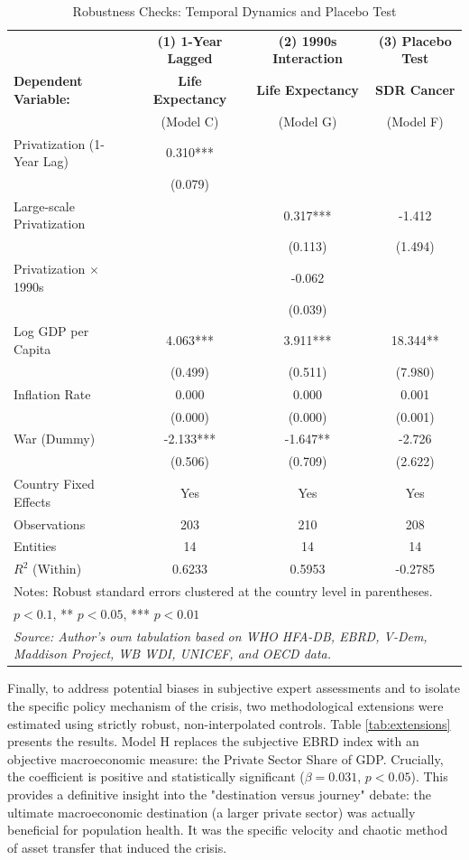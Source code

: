 \documentclass[en,magisterska]{pracamgr}
\begin{document}
\begin{table}[H]
\centering
\caption{Robustness Checks: Temporal Dynamics and Placebo Test}
\label{tab:robustness_c}
\footnotesize
\begin{tabular}{l c c c}
\toprule
 & \textbf{(1) 1-Year Lagged} & \textbf{(2) 1990s Interaction} & \textbf{(3) Placebo Test} \\
\textbf{Dependent Variable:} & \textbf{Life Expectancy} & \textbf{Life Expectancy} & \textbf{SDR Cancer} \\
 & (Model C) & (Model G) & (Model F) \\
\midrule
Privatization (1-Year Lag) & 0.310*** & & \\
 & (0.079) & & \\
Large-scale Privatization & & 0.317*** & -1.412 \\
 & & (0.113) & (1.494) \\
Privatization $\times$ 1990s & & -0.062 & \\
 & & (0.039) & \\
Log GDP per Capita & 4.063*** & 3.911*** & 18.344** \\
 & (0.499) & (0.511) & (7.980) \\
Inflation Rate & 0.000 & 0.000 & 0.001 \\
 & (0.000) & (0.000) & (0.001) \\
War (Dummy) & -2.133*** & -1.647** & -2.726 \\
 & (0.506) & (0.709) & (2.622) \\
\midrule
Country Fixed Effects & Yes & Yes & Yes \\
Observations & 203 & 210 & 208 \\
Entities & 14 & 14 & 14 \\
$R^2$ (Within) & 0.6233 & 0.5953 & -0.2785 \\
\bottomrule
\multicolumn{4}{l}{\scriptsize Notes: Robust standard errors clustered at the country level in parentheses.} \\
\multicolumn{4}{l}{\scriptsize * $p < 0.1$, ** $p < 0.05$, *** $p < 0.01$} \\
\multicolumn{4}{l}{\scriptsize \textit{Source: Author's own tabulation based on WHO HFA-DB, EBRD, V-Dem, Maddison Project, WB WDI, UNICEF, and OECD data.}} \\
\end{tabular}
\end{table}

Finally, to address potential biases in subjective expert assessments and to isolate the specific policy mechanism of the crisis, two methodological extensions were estimated using strictly 
robust, non-interpolated controls. Table \ref{tab:extensions} presents the results. Model H replaces the subjective EBRD index with an objective macroeconomic measure: the Private Sector 
Share of GDP. Crucially, the coefficient is positive and statistically significant ($\beta = 0.031$, $p < 0.05$). This provides a definitive insight into the "destination versus journey" 
debate: the ultimate macroeconomic destination (a larger private sector) was actually beneficial for population health. It was the specific velocity and chaotic method of asset transfer that 
induced the crisis. 
\end{document}
